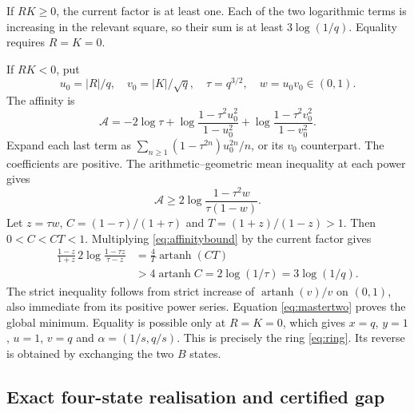 \documentclass[11pt,a4paper]{article}
\theoremstyle{remark}\newtheorem{remark}[theorem]{Remark}
\newcommand{\atanh}{\operatorname{artanh}}
\begin{document}
If $RK\geq0$, the current factor is at least one. Each of the two
logarithmic terms is increasing in the relevant square, so their sum is at
least $3\log(1/q)$. Equality requires $R=K=0$.

If $RK<0$, put
\begin{equation}
 u_0=|R|/q,\quad v_0=|K|/\sqrt q,\quad
 \tau=q^{3/2},\quad w=u_0v_0\in(0,1).
\end{equation}
The affinity is
\begin{equation}
 \mathcal A=-2\log\tau+
 \log\frac{1-\tau^2u_0^2}{1-u_0^2}+
 \log\frac{1-\tau^2v_0^2}{1-v_0^2}.
\end{equation}
Expand each last term as
$\sum_{n\geq1}(1-\tau^{2n})u_0^{2n}/n$, or its $v_0$ counterpart.
The coefficients are positive. The arithmetic--geometric mean inequality
at each power gives
\begin{equation}\label{eq:affinitybound}
 \mathcal A\geq2\log\frac{1-\tau^2w}{\tau(1-w)}.
\end{equation}
Let $z=\tau w$, $C=(1-\tau)/(1+\tau)$ and $T=(1+z)/(1-z)>1$.
Then $0<C<CT<1$. Multiplying \eqref{eq:affinitybound} by the current factor
gives
\begin{align}
 \frac{1-z}{1+z}\,2\log\frac{1-\tau z}{\tau-z}
 &=\frac4T\atanh(CT)\nonumber\\
 &>4\atanh C=2\log(1/\tau)=3\log(1/q).
\end{align}
The strict inequality follows from strict increase of $\atanh(v)/v$ on
$(0,1)$, also immediate from its positive power series. Equation
\eqref{eq:mastertwo} proves the global minimum. Equality is possible only
at $R=K=0$, which gives $x=q$, $y=1$, $u=1$, $v=q$ and
$\alpha=(1/s,q/s)$. This is precisely the ring \eqref{eq:ring}.
Its reverse is obtained by exchanging the two $B$ states.

\subsection{Exact four-state realisation and certified gap}
\end{document}
